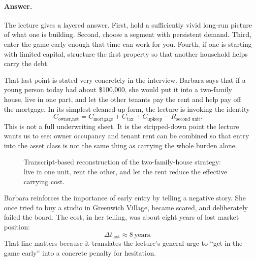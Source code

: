 \paragraph{Answer.} The lecture gives a layered answer. First, hold a sufficiently vivid long-run picture of what one is building. Second, choose a segment with persistent demand. Third, enter the game early enough that time can work for you. Fourth, if one is starting with limited capital, structure the first property so that another household helps carry the debt.

That last point is stated very concretely in the interview. Barbara says that if a young person today had about \$100{,}000, she would put it into a two-family house, live in one part, and let the other tenants pay the rent and help pay off the mortgage. In its simplest cleaned-up form, the lecture is invoking the identity
\begin{equation}
C_{\text{owner,net}}
=
C_{\text{mortgage}}+C_{\text{tax}}+C_{\text{upkeep}}-R_{\text{second unit}}.
\end{equation}
This is not a full underwriting sheet. It is the stripped-down point the lecture wants us to see: owner occupancy and tenant rent can be combined so that entry into the asset class is not the same thing as carrying the whole burden alone.

\begin{figure}[h]
\centering
{}
\caption{Transcript-based reconstruction of the two-family-house strategy: live in one unit, rent the other, and let the rent reduce the effective carrying cost.}
\end{figure}

Barbara reinforces the importance of early entry by telling a negative story. She once tried to buy a studio in Greenwich Village, became scared, and deliberately failed the board. The cost, in her telling, was about eight years of lost market position:
\begin{equation}
\Delta t_{\text{lost}} \approx 8\ \text{years}.
\end{equation}
That line matters because it translates the lecture's general urge to ``get in the game early'' into a concrete penalty for hesitation.

